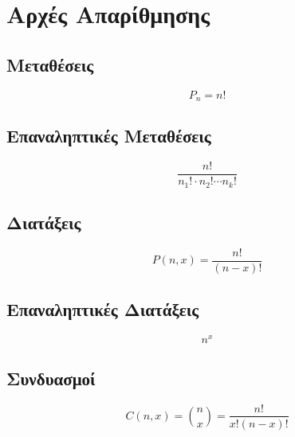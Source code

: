 


\section{Αρχές Απαρίθμησης}

\begin{multicols}{2}
  \subsection*{Μεταθέσεις}
  \[
   P_{n}=n!
  \]

  \subsection*{Επαναληπτικές Μεταθέσεις}
  \[
  \frac{n!}{n_{1}!\cdot n_{2}! \cdots n_{k}!}
  \]
\end{multicols}

\begin{multicols}{2}
  \subsection*{Διατάξεις}
  \[
  P(n,x)=\frac{n!}{(n-x)!}
  \]

  \subsection*{Επαναληπτικές Διατάξεις}
  \[
  n^{x}
  \]
\end{multicols}

\begin{multicols}{2}
  \subsection*{Συνδυασμοί}
  \[
  C(n,x)=\binom{n}{x}=\frac{n!}{x!(n-x)!}
  \]
\end{multicols}
